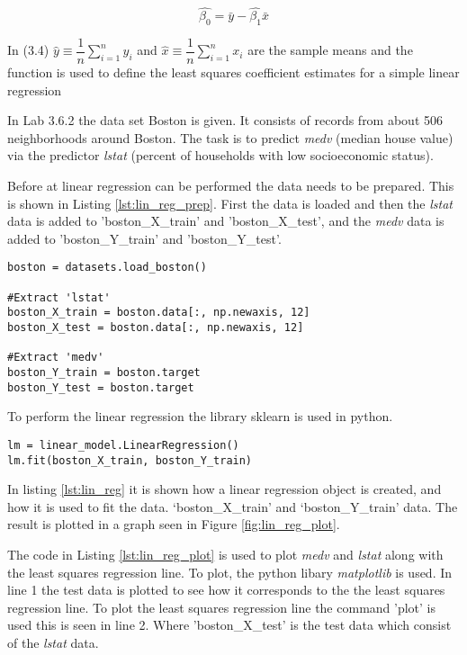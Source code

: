 \begin{equation}
\hat{\beta_0} = \bar{y} -\hat{\beta_1}\bar{x}
\end{equation}

In (3.4) $\hat{y} \equiv \dfrac{1}{n}\sum\limits_{i=1}^ny_i$ and 
$\hat{x}\equiv \dfrac{1}{n}\sum\limits_{i=1}^nx_i$ are the sample means and the function is used to define the least squares coefficient estimates for a simple linear regression 

In Lab 3.6.2 the data set Boston is given. It consists of records from about 506 neighborhoods around Boston. The task is to predict \emph{medv} (median house value) via the predictor \emph{lstat} (percent of households with low socioeconomic status).

Before at linear regression can be performed the data needs to be prepared. This is shown in Listing \ref{lst:lin_reg_prep}. First the data is loaded and then the \emph{lstat} data is added to 'boston\_X\_train' and 'boston\_X\_test', and the \emph{medv} data is added to 'boston\_Y\_train' and 'boston\_Y\_test'.

\begin{lstlisting}[caption={Data preparation for linear regression}, label=lst:lin_reg_prep, mathescape=true]
boston = datasets.load_boston()

#Extract 'lstat'
boston_X_train = boston.data[:, np.newaxis, 12]
boston_X_test = boston.data[:, np.newaxis, 12]

#Extract 'medv'
boston_Y_train = boston.target
boston_Y_test = boston.target
\end{lstlisting}

To perform the linear regression the library sklearn is used in python. 

\begin{lstlisting}[caption={Python Linear Regression function}, label=lst:lin_reg, mathescape=true]
lm = linear_model.LinearRegression()
lm.fit(boston_X_train, boston_Y_train)
\end{lstlisting}

In listing \ref{lst:lin_reg} it is shown how a linear regression object is created, and how it is used to fit the data. ‘boston\_X\_train’ and ‘boston\_Y\_train’ data.
The result is plotted in a graph seen in Figure \ref{fig:lin_reg_plot}.


The code in Listing \ref{lst:lin_reg_plot} is used to plot \emph{medv} and \emph{lstat} along with the least squares regression line. To plot, the python libary \emph{matplotlib} is used. In line 1 the test data is plotted to see how it corresponds to the the least squares regression line. To plot the least squares regression line the command 'plot' is used this is seen in line 2. Where 'boston\_X\_test' is the test data which consist of the \emph{lstat} data. 

